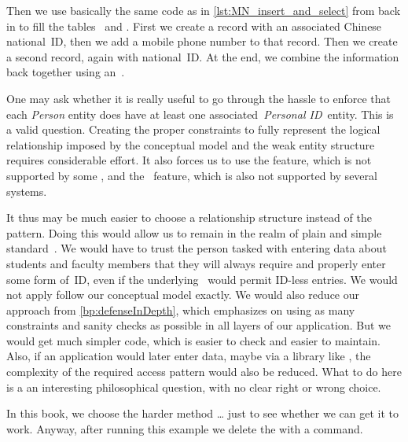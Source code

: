 Then we use basically the same code as in \cref{lst:MN_insert_and_select} from back in  to fill the tables~ and .
First we create a  record with an associated Chinese national~ID, then we add a mobile phone number to that record.
Then we create a second record, again with national~ID.
At the end, we combine the information back together using an~.

One may ask whether it is really useful to go through the hassle to enforce that each \emph{Person} entity does have at least one associated~\emph{Personal ID}~entity.
This is a valid question.
Creating the proper constraints to fully represent the logical relationship imposed by the conceptual model and the weak entity structure requires considerable effort.
It also forces us to use the  feature, which is not supported by some , and the ~feature, which is also not supported by several systems.

It thus may be much easier to choose a  relationship structure instead of the  pattern.
Doing this would allow us to remain in the realm of plain and simple standard~\sql.
We would have to trust the person tasked with entering data about students and faculty members that they will always require and properly enter some form of~ID, even if the underlying \db\ would permit ID\nobreakdashes-less entries.
We would not apply follow our conceptual model exactly.
We would also reduce our  approach from \cref{bp:defenseInDepth}, which emphasizes on using as many constraints and sanity checks as possible in all layers of our application.
But we would get much simpler code, which is easier to check and easier to maintain.
Also, if an application would later enter data, maybe via a library like \psycopg, the complexity of the required access pattern would also be reduced.
What to do here is a an interesting philosophical question, with no clear right or wrong choice.

In this book, we choose the harder method {\dots} just to see whether we can get it to work.
Anyway, after running this example we delete the  with a  command.
%
\FloatBarrier%
\endhsection%
%
